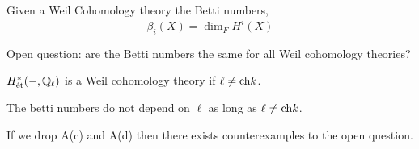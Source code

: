 \documentclass[12pt]{article}
\begin{document}
\begin{definition}
Given a Weil Cohomology theory the Betti numbers,
\[ \beta_i(X) = \dim_F H^i(X) \]
\end{definition}

\begin{remark}
Open question: are the Betti numbers the same for all Weil cohomology theories?
\end{remark}

\begin{theorem}
$H^*_{\text{\'{e}t}}(-, \mathbb{Q}_\ell)$ is a Weil cohomology theory if $\ell \neq \mathrm{ch}{k}$. 
\end{theorem}

\begin{theorem}
The \etale betti numbers do not depend on $\ell$ as long as $\ell \neq \mathrm{ch}{k}$.
\end{theorem}

\begin{proposition}
If we drop A(c) and A(d) then there exists counterexamples to the open question. 
\end{proposition}
\end{document}
